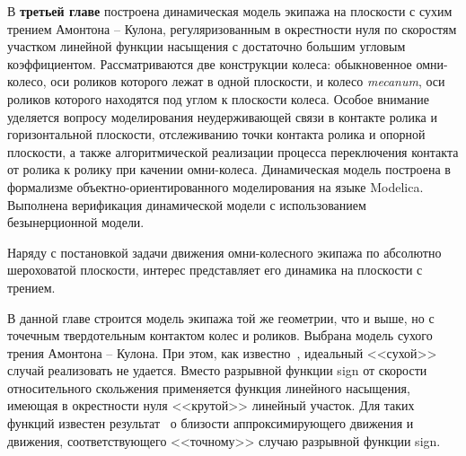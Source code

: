 
В \textbf{третьей главе} построена динамическая модель экипажа на плоскости с сухим трением Амонтона -- Кулона, регуляризованным в окрестности нуля по скоростям участком линейной функции насыщения с достаточно большим угловым коэффициентом. Рассматриваются две конструкции колеса: обыкновенное омни-колесо, оси роликов которого лежат в одной плоскости, и колесо \textit{mecanum}, оси роликов которого находятся под углом к плоскости колеса. Особое внимание уделяется вопросу моделирования неудерживающей связи в контакте ролика и горизонтальной плоскости, отслеживанию точки контакта ролика и опорной плоскости, а также алгоритмической реализации процесса переключения контакта от ролика к ролику при качении омни-колеса. Динамическая модель построена в формализме объектно-ориентированного моделирования на языке Modelica. Выполнена верификация динамической модели с использованием безынерционной модели.

%
Наряду с постановкой задачи движения омни-колесного экипажа по абсолютно шероховатой плоскости, интерес представляет его динамика на плоскости с трением.

В данной главе строится модель экипажа той же геометрии, что и выше,
но с точечным твердотельным контактом колес и роликов.
Выбрана модель сухого трения Амонтона -- Кулона. При этом, как известно~\cite{Novozhilov1991}, 
идеальный <<сухой>> случай реализовать не удается. Вместо разрывной функции 
sign от скорости относительного скольжения применяется функция линейного насыщения,
имеющая в окрестности нуля <<крутой>> линейный участок. Для таких функций известен 
результат~\cite{Novozhilov1991} о близости аппроксимирующего движения и движения, 
соответствующего <<точному>> случаю разрывной функции sign. 


